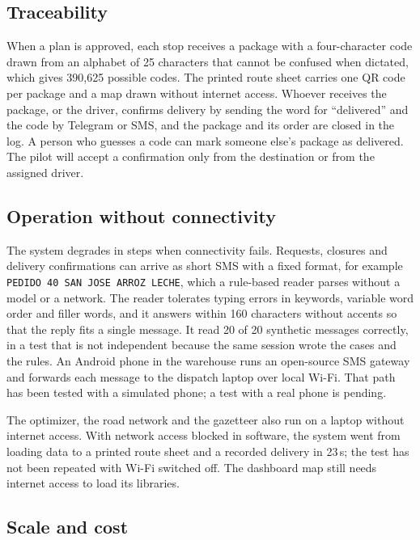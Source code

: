 \documentclass[11pt]{article}
\newcommand{\code}[1]{\texttt{\small #1}}
\begin{document}
\subsection{Traceability}

When a plan is approved, each stop receives a package with a four-character code drawn from an alphabet of 25 characters that cannot be confused when dictated, which gives 390,625 possible codes. The printed route sheet carries one QR code per package and a map drawn without internet access. Whoever receives the package, or the driver, confirms delivery by sending the word for ``delivered'' and the code by Telegram or SMS, and the package and its order are closed in the log. A person who guesses a code can mark someone else's package as delivered. The pilot will accept a confirmation only from the destination or from the assigned driver.

\subsection{Operation without connectivity}

The system degrades in steps when connectivity fails. Requests, closures and delivery confirmations can arrive as short SMS with a fixed format, for example \code{PEDIDO 40 SAN JOSE ARROZ LECHE}, which a rule-based reader parses without a model or a network. The reader tolerates typing errors in keywords, variable word order and filler words, and it answers within 160 characters without accents so that the reply fits a single message. It read 20 of 20 synthetic messages correctly, in a test that is not independent because the same session wrote the cases and the rules. An Android phone in the warehouse runs an open-source SMS gateway and forwards each message to the dispatch laptop over local Wi-Fi. That path has been tested with a simulated phone; a test with a real phone is pending. 

The optimizer, the road network and the gazetteer also run on a laptop without internet access. With network access blocked in software, the system went from loading data to a printed route sheet and a recorded delivery in 23\,s; the test has not been repeated with Wi-Fi switched off. The dashboard map still needs internet access to load its libraries.

\subsection{Scale and cost}
\end{document}
